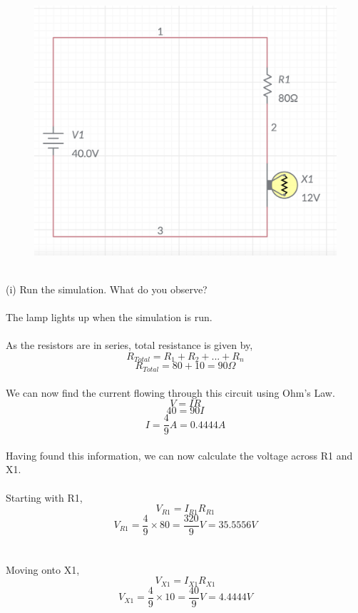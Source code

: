 \documentclass[12pt]{article}
\begin{document}
\begin{figure}[!h] 
	\begin{centering}
		\includegraphics[keepaspectratio = true, width = 5in]{Q2(i).png}
	\end{centering}
\end{figure}\\
\noindent (i) Run the simulation. What do you observe?\\
\\
The lamp lights up when the simulation is run.\\
\\
As the resistors are in series, total resistance is given by,\\
\[R_{Total} = R_1 + R_2 + ... + R_n\]
\[R_{Total} = 80 + 10 = 90\Omega\]\\
We can now find the current flowing through this circuit using Ohm's Law.\\
\[V = IR\]
\[40 = 90I\]
\[I = \frac{4}{9}A = 0.4444A\]\\
Having found this information, we can now calculate the voltage across R1 and X1.\\
\\
Starting with R1,\\
\[V_{R1} = I_{R1}R_{R1}\]
\[V_{R1} = \frac{4}{9} \times 80 = \frac{320}{9}V = 35.5556V\]\\
\\
Moving onto X1,\\
\[V_{X1} = I_{X1}R_{X1}\]
\[V_{X1} = \frac{4}{9} \times 10 = \frac{40}{9}V = 4.4444V\]\\
\end{document}
